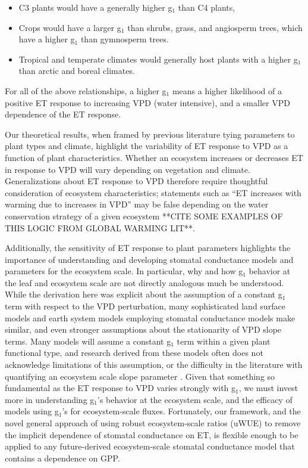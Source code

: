 \begin{itemize}
  \item C3 plants would have a generally higher g$_1$ than C4 plants,
  \item Crops would have a larger g$_1$ than shrubs, grass, and
    angiosperm trees, which have a higher g$_1$ than gymnosperm
    trees.
  \item Tropical and temperate climates would generally host plants
    with a higher g$_1$ than arctic and boreal climates.
\end{itemize}
For all of the above relationships, a higher g$_1$ means a higher
likelihood of a positive ET response to increasing VPD (water
intensive), and a smaller VPD dependence of the ET response.

Our theoretical results, when framed by previous literature tying
parameters to plant types and climate, highlight the variability of ET
response to VPD as a function of plant characteristics. Whether an
ecosystem increases or decreases ET in response to VPD will vary
depending on vegetation and climate. Generalizations about ET response
to VPD therefore require thoughtful consideration of ecosystem
characteristics; statements such as ``ET increases with warming due to
increases in VPD'' may be false depending on the water conservation
strategy of a given ecosystem **CITE SOME EXAMPLES OF THIS LOGIC FROM
GLOBAL WARMING LIT**.

Additionally, the sensitivity of ET response to plant parameters
highlights the importance of understanding and developing stomatal
conductance models and parameters for the ecosystem scale. In
particular, why and how g$_1$ behavior at the leaf and ecosystem scale
are not directly analogous much be understood. While the derivation
here was explicit about the assumption of a constant g$_1$ term with
respect to the VPD perturbation, many sophisticated land surface
models and earth system models employing stomatal conductance models
make similar, and even stronger assumptions about the stationarity of
VPD slope terms. Many models will assume a constant g$_1$ term within
a given plant functional type, and research derived from these models
often does not acknowledge limitations of this assumption, or the
difficulty in the literature with quantifying an ecosystem scale slope
parameter \citep{Medlyn_2017}. Given that something so fundamental as
the ET response to VPD varies strongly with g$_1$, we must invest more
in understanding g$_1$'s behavior at the ecosystem scale, and the
efficacy of models using g$_1$'s for ecosystem-scale
fluxes. Fortunately, our framework, and the novel general approach of
using robust ecosystem-scale ratios (uWUE) to remove the implicit
dependence of stomatal conductance on ET, is flexible enough to be
applied to any future-derived ecosystem-scale stomatal conductance
model that contains a dependence on GPP.

